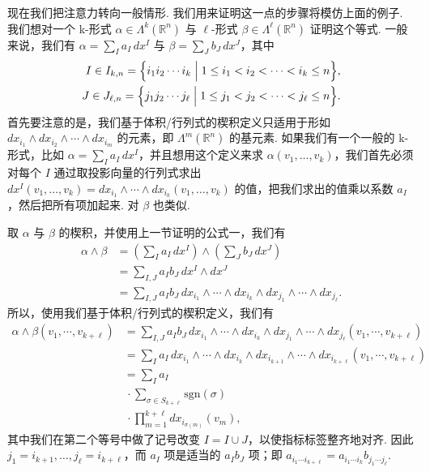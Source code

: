 现在我们把注意力转向一般情形. 我们用来证明这一点的步骤将模仿上面的例子. 我们想对一个 k-形式 $\alpha\in\Lambda^k(\mathbb{R}^n)$ 与 $\ell$-形式 $\beta\in\Lambda^\ell(\mathbb{R}^n)$ 证明这个等式. 一般来说，我们有 $\alpha=\sum_{I}a_I\,dx^I$ 与 $\beta=\sum_{J}b_J\,dx^J$，其中
\begin{align*}
I\in I_{k,n}=\Bigl\{i_1i_2\cdots i_k\;\Big|\;1\leq i_1<i_2<\cdots<i_k\leq n\Bigr\}, \\
J\in J_{\ell,n}=\Bigl\{j_1j_2\cdots j_\ell\;\Big|\;1\leq j_1<j_2<\cdots<j_\ell\leq n\Bigr\}.
\end{align*}
首先要注意的是，我们基于体积/行列式的楔积定义只适用于形如 $dx_{i_1}\wedge dx_{i_2}\wedge\cdots\wedge dx_{i_m}$ 的元素，即 $\Lambda^m(\mathbb{R}^n)$ 的基元素. 如果我们有一个一般的 k-形式，比如 $\alpha=\sum_{I}a_I\,dx^I$，并且想用这个定义来求 $\alpha(v_1,\ldots,v_k)$，我们首先必须对每个 $I$ 通过取投影向量的行列式求出 $dx^I(v_1,\ldots,v_k)=dx_{i_1}\wedge\cdots\wedge dx_{i_k}(v_1,\ldots,v_k)$ 的值，把我们求出的值乘以系数 $a_I$，然后把所有项加起来. 对 $\beta$ 也类似.

取 $\alpha$ 与 $\beta$ 的楔积，并使用上一节证明的公式一，我们有
\begin{align*}
\alpha\wedge\beta
&=\left(\sum_{I}a_I\,dx^I\right)\wedge\left(\sum_{J}b_J\,dx^J\right)\\
&=\sum_{I,J}a_Ib_J\,dx^I\wedge dx^J\\
&=\sum_{I,J}a_Ib_J\,dx_{i_1}\wedge\cdots\wedge dx_{i_k}\wedge dx_{j_1}\wedge\cdots\wedge dx_{j_\ell}.
\end{align*}
所以，使用我们基于体积/行列式的楔积定义，我们有
\begin{align*}
\alpha\wedge\beta(v_1,\cdots,v_{k+\ell})
&=\sum_{I,J}a_Ib_J\,dx_{i_1}\wedge\cdots\wedge dx_{i_k}\wedge dx_{j_1}\wedge\cdots\wedge dx_{j_\ell}(v_1,\cdots,v_{k+\ell})\\
&=\sum_{I}a_I\,dx_{i_1}\wedge\cdots\wedge dx_{i_k}\wedge dx_{i_{k+1}}\wedge\cdots\wedge dx_{i_{k+\ell}}(v_1,\cdots,v_{k+\ell})\\
&=\sum_{I}a_I\\
&\,\cdot\sum_{\sigma\in S_{k+\ell}}\mathrm{sgn}(\sigma)\\
&\,\cdot\prod_{m=1}^{k+\ell}dx_{i_{\sigma(m)}}(v_m),
\end{align*}
其中我们在第二个等号中做了记号改变 $I=I\cup J$，以使指标标签整齐地对齐. 因此 $j_1=i_{k+1},\ldots,j_\ell=i_{k+\ell}$，而 $a_I$ 项是适当的 $a_Ib_J$ 项；即 $a_{i_1\cdots i_{k+\ell}}=a_{i_1\cdots i_k}b_{j_1\cdots j_\ell}$.

